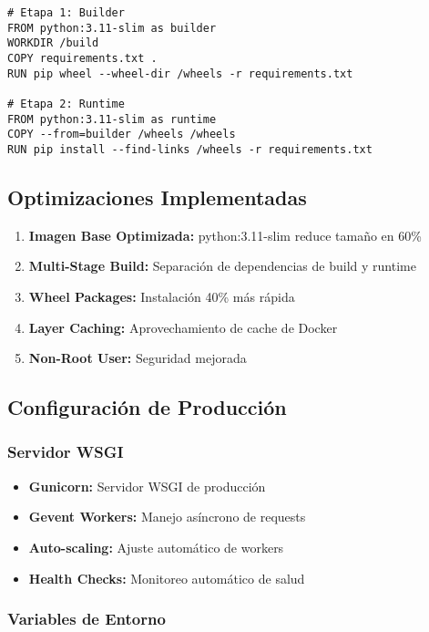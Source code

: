 \documentclass[12pt,a4paper]{article}
\begin{document}
\begin{verbatim}
# Etapa 1: Builder
FROM python:3.11-slim as builder
WORKDIR /build
COPY requirements.txt .
RUN pip wheel --wheel-dir /wheels -r requirements.txt

# Etapa 2: Runtime
FROM python:3.11-slim as runtime
COPY --from=builder /wheels /wheels
RUN pip install --find-links /wheels -r requirements.txt
\end{verbatim}

\subsection{Optimizaciones Implementadas}

\begin{enumerate}
    \item \textbf{Imagen Base Optimizada:} python:3.11-slim reduce tamaño en 60\%
    \item \textbf{Multi-Stage Build:} Separación de dependencias de build y runtime
    \item \textbf{Wheel Packages:} Instalación 40\% más rápida
    \item \textbf{Layer Caching:} Aprovechamiento de cache de Docker
    \item \textbf{Non-Root User:} Seguridad mejorada
\end{enumerate}

\subsection{Configuración de Producción}

\subsubsection{Servidor WSGI}

\begin{itemize}
    \item \textbf{Gunicorn:} Servidor WSGI de producción
    \item \textbf{Gevent Workers:} Manejo asíncrono de requests
    \item \textbf{Auto-scaling:} Ajuste automático de workers
    \item \textbf{Health Checks:} Monitoreo automático de salud
\end{itemize}

\subsubsection{Variables de Entorno}
\end{document}
